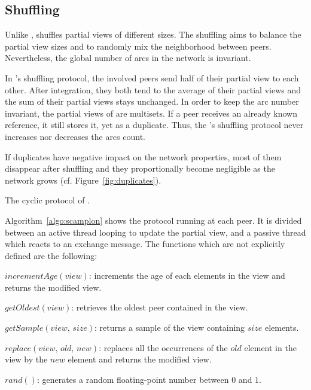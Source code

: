 \subsection{Shuffling}
\label{subsec:cyclic}

Unlike \CYCLON, \SPRAY shuffles partial views of different sizes. The shuffling
aims to balance the partial view sizes and to randomly mix the neighborhood
between peers. Nevertheless, the global number of arcs in the network is
invariant.

In \SPRAY's shuffling protocol, the involved peers send half of their partial
view to each other. After integration, they both tend to the average of their
partial views and the sum of their partial views stays unchanged. In order to
keep the arc number invariant, the partial views of \SPRAY are multisets. If a
peer receives an already known reference, it still stores it, yet as a
duplicate. Thus, the \SPRAY's shuffling protocol never increases nor decreases
the arcs count.

If duplicates have negative impact on the network properties, most of them
disappear after shuffling and they proportionally become negligible as the
network grows (cf. Figure~\ref{fig:duplicates}).

\begin{algorithm}[h]
  
  \caption{\label{algo:scamplon}The cyclic protocol of \SPRAY.}
\end{algorithm}

Algorithm~\ref{algo:scamplon} shows the \SPRAY protocol running at each
peer. It is divided between an active thread looping to update the partial
view, and a passive thread which reacts to an exchange message. The functions
which are not explicitly defined are the following:
\begin{compactitem}
\item $incrementAge(view)$: increments the age of each elements in the view
  and returns the modified view.
\item $getOldest(view)$: retrieves the oldest peer contained in the view.
\item $getSample(view, \, size)$: returns a sample of the view containing
  $size$ elements.
\item $replace(view,\,old,\,new)$: replaces all the occurrences of the
  $old$ element in the view by the $new$ element and returns the
  modified view.
\item $rand()$: generates a random floating-point number between $0$ and $1$.
\end{compactitem}

